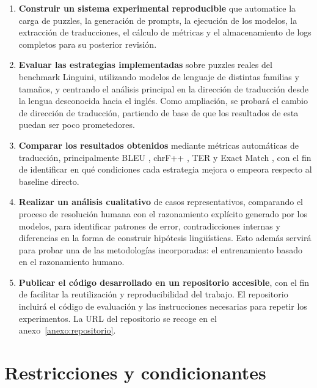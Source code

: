 \begin{enumerate}
	\item \textbf{Construir un sistema experimental reproducible} que automatice la carga de puzzles, la generación de prompts, la ejecución de los modelos, la extracción de traducciones, el cálculo de métricas y el almacenamiento de logs completos para su posterior revisión.
	
	\item \textbf{Evaluar las estrategias implementadas} sobre puzzles reales del benchmark Linguini, utilizando modelos de lenguaje de distintas familias y tamaños, y centrando el análisis principal en la dirección de traducción desde la lengua desconocida hacia el inglés. Como ampliación, se probará el cambio de dirección de traducción, partiendo de base de que los resultados de esta puedan ser poco prometedores.
	
	\item \textbf{Comparar los resultados obtenidos} mediante métricas automáticas de traducción, principalmente BLEU \citep{papineni2002bleu}, chrF++ \citep{popovic2017chrf}, TER \citep{snover2006ter} y Exact Match \citep{sanchez2024linguini}, con el fin de identificar en qué condiciones cada estrategia mejora o empeora respecto al baseline directo.
	
	\item \textbf{Realizar un análisis cualitativo} de casos representativos, comparando el proceso de resolución humana con el razonamiento explícito generado por los modelos, para identificar patrones de error, contradicciones internas y diferencias en la forma de construir hipótesis lingüísticas. Esto además servirá para probar una de las metodologías incorporadas: el entrenamiento basado en el razonamiento humano.
	
	\item \textbf{Publicar el código desarrollado en un repositorio accesible}, con el fin de facilitar la reutilización y reproducibilidad del trabajo. El repositorio incluirá el código de evaluación y las instrucciones necesarias para repetir los experimentos. La URL del repositorio se recoge en el anexo~\ref{anexo:repositorio}.
	
\end{enumerate}

\section{Restricciones y condicionantes}
\label{sec:restricciones}

